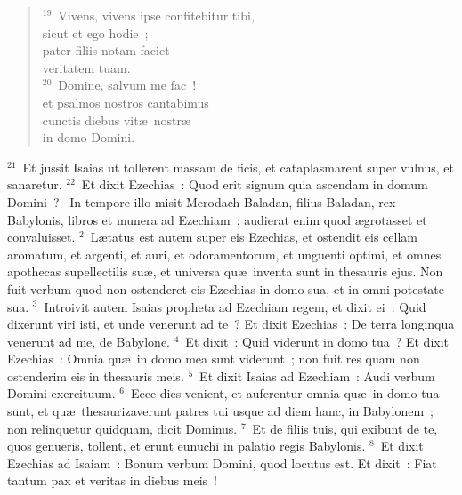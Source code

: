 \begin{flushleft}
\begin{verse}
${}^{19}$~Vivens, vivens ipse confitebitur tibi,\\ sicut et ego hodie~;\\ pater filiis notam faciet\\ veritatem tuam.\\
${}^{20}$~Domine, salvum me fac~!\\ et psalmos nostros cantabimus\\ cunctis diebus vit\ae\ nostr\ae \\ in domo Domini.\end{verse}\end{flushleft}


${}^{21}$~Et jussit Isaias ut tollerent massam de ficis, et cataplasmarent super vulnus, et sanaretur.
${}^{22}$~Et dixit Ezechias~: Quod erit signum quia ascendam in domum Domini~?
~\lettrine[lines=10,image=true,loversize=0.05,lraise=-0.03]{I}{}n tempore illo misit Merodach Baladan, filius Baladan, rex Babylonis, libros et munera ad Ezechiam~: audierat enim quod \ae grotasset et convaluisset.
${}^{2}$~L\ae tatus est autem super eis Ezechias, et ostendit eis cellam aromatum, et argenti, et auri, et odoramentorum, et unguenti optimi, et omnes apothecas supellectilis su\ae , et universa qu\ae\ inventa sunt in thesauris ejus. Non fuit verbum quod non ostenderet eis Ezechias in domo sua, et in omni potestate sua.
${}^{3}$~Introivit autem Isaias propheta ad Ezechiam regem, et dixit ei~: Quid dixerunt viri isti, et unde venerunt ad te~? Et dixit Ezechias~: De terra longinqua venerunt ad me, de Babylone.
${}^{4}$~Et dixit~: Quid viderunt in domo tua~? Et dixit Ezechias~: Omnia qu\ae\ in domo mea sunt viderunt~; non fuit res quam non ostenderim eis in thesauris meis.
${}^{5}$~Et dixit Isaias ad Ezechiam~: Audi verbum Domini exercituum.
${}^{6}$~Ecce dies venient, et auferentur omnia qu\ae\ in domo tua sunt, et qu\ae\ thesaurizaverunt patres tui usque ad diem hanc, in Babylonem~; non relinquetur quidquam, dicit Dominus.
${}^{7}$~Et de filiis tuis, qui exibunt de te, quos genueris, tollent, et erunt eunuchi in palatio regis Babylonis.
${}^{8}$~Et dixit Ezechias ad Isaiam~: Bonum verbum Domini, quod locutus est. Et dixit~: Fiat tantum pax et veritas in diebus meis~!
